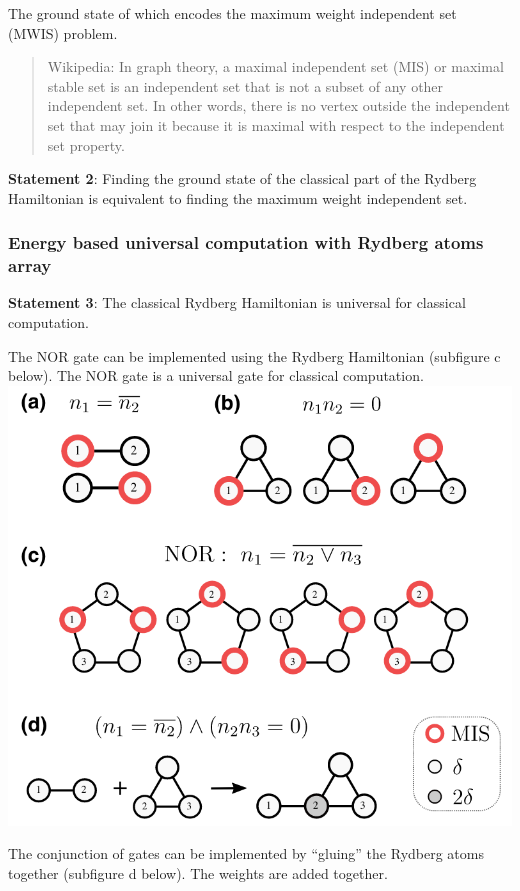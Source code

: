 \documentclass[twocolumn,superscriptaddress,english,showpacs,longbibliography]{revtex4-2}
\begin{document}
The ground state of which encodes the maximum weight independent set
(MWIS) problem.

\begin{quote}
Wikipedia: In graph theory, a maximal independent set (MIS) or maximal
stable set is an independent set that is not a subset of any other
independent set. In other words, there is no vertex outside the
independent set that may join it because it is maximal with respect to
the independent set property.
\end{quote}

\textbf{Statement 2}: Finding the ground state of the classical part of
the Rydberg Hamiltonian is equivalent to finding the maximum weight
independent set.

\subsubsection{Energy based universal computation with Rydberg atoms
array}\label{energy-based-universal-computation-with-rydberg-atoms-array}

\textbf{Statement 3}: The classical Rydberg Hamiltonian is universal for classical computation.

The NOR gate can be implemented using the Rydberg Hamiltonian (subfigure
c below). The NOR gate is a universal gate for classical computation.
\includegraphics[width=\columnwidth]{../notes/images/gadgets.png}

The conjunction of gates can be implemented by ``gluing'' the Rydberg
atoms together (subfigure d below). The weights are added together.
\end{document}
